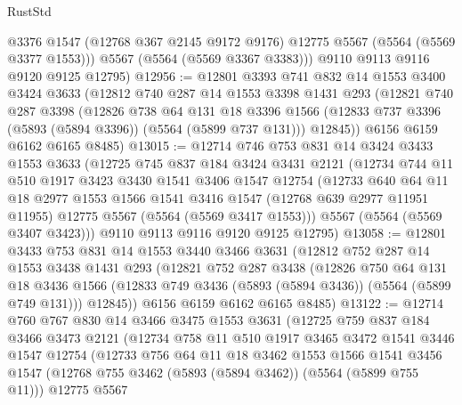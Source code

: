 \begin{lexlean}{RustStd}
\begin{coremodule}
          @3376
          @1547
          (@12768 @367 @2145 @9172 @9176)
          @12775
          @5567
          (@5564 (@5569 @3377 @1553)))
        @5567
        (@5564 (@5569 @3367 @3383)))
      @9110
      @9113
      @9116
      @9120
      @9125
      @12795)
@12956 := @12801
    @3393
    @741
    @832
    @14
    @1553
    @3400
    @3424
    @3633
    (@12812
      @740
      @287
      @14
      @1553
      @3398
      @1431
      @293
      (@12821
        @740
        @287
        @3398
        (@12826
          @738
          @64
          @131
          @18
          @3396
          @1566
          (@12833 @737 @3396 (@5893 (@5894 @3396)) (@5564 (@5899 @737 @131)))
          @12845))
      @6156
      @6159
      @6162
      @6165
      @8485)
@13015 := @12714
    @746
    @753
    @831
    @14
    @3424
    @3433
    @1553
    @3633
    (@12725
      @745
      @837
      @184
      @3424
      @3431
      @2121
      (@12734
        @744
        @11
        @510
        @1917
        @3423
        @3430
        @1541
        @3406
        @1547
        @12754
        (@12733
          @640
          @64
          @11
          @18
          @2977
          @1553
          @1566
          @1541
          @3416
          @1547
          (@12768 @639 @2977 @11951 @11955)
          @12775
          @5567
          (@5564 (@5569 @3417 @1553)))
        @5567
        (@5564 (@5569 @3407 @3423)))
      @9110
      @9113
      @9116
      @9120
      @9125
      @12795)
@13058 := @12801
    @3433
    @753
    @831
    @14
    @1553
    @3440
    @3466
    @3631
    (@12812
      @752
      @287
      @14
      @1553
      @3438
      @1431
      @293
      (@12821
        @752
        @287
        @3438
        (@12826
          @750
          @64
          @131
          @18
          @3436
          @1566
          (@12833 @749 @3436 (@5893 (@5894 @3436)) (@5564 (@5899 @749 @131)))
          @12845))
      @6156
      @6159
      @6162
      @6165
      @8485)
@13122 := @12714
    @760
    @767
    @830
    @14
    @3466
    @3475
    @1553
    @3631
    (@12725
      @759
      @837
      @184
      @3466
      @3473
      @2121
      (@12734
        @758
        @11
        @510
        @1917
        @3465
        @3472
        @1541
        @3446
        @1547
        @12754
        (@12733
          @756
          @64
          @11
          @18
          @3462
          @1553
          @1566
          @1541
          @3456
          @1547
          (@12768 @755 @3462 (@5893 (@5894 @3462)) (@5564 (@5899 @755 @11)))
          @12775
          @5567

\end{coremodule}
\end{lexlean}
